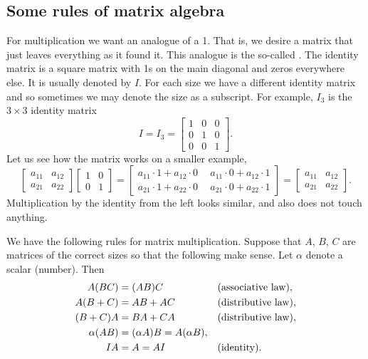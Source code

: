 \subsection{Some rules of matrix algebra}

For multiplication we want an analogue of a 1.  That is,
we desire a matrix that just leaves everything as it found it.
This analogue is the
so-called \emph{}.
The identity matrix is a square matrix with 1s on the
main diagonal and zeros everywhere else.  It is usually denoted by $I$.
For each size we have a different identity matrix and so sometimes we may denote
the size as a subscript.  For example, $I_3$ is the $3 \times 3$
identity matrix
\begin{equation*}
I = I_3 =
\begin{bmatrix}
1 & 0 & 0 \\
0 & 1 & 0 \\
0 & 0 & 1
\end{bmatrix} .
\end{equation*}
Let us see how the matrix works on a smaller example,
\begin{equation*}
\begin{bmatrix}
a_{11} & a_{12} \\
a_{21} & a_{22}
\end{bmatrix}
\begin{bmatrix}
1 & 0 \\
0 & 1
\end{bmatrix} =
\begin{bmatrix}
a_{11} \cdot 1 + a_{12} \cdot 0
& ~~
a_{11} \cdot 0 + a_{12} \cdot 1
\\
a_{21} \cdot 1 + a_{22} \cdot 0
& ~~
a_{21} \cdot 0 + a_{22} \cdot 1
\end{bmatrix}
=
\begin{bmatrix}
a_{11} & a_{12} \\
a_{21} & a_{22}
\end{bmatrix} .
\end{equation*}
Multiplication by the identity from the left looks similar, and also
does not touch anything.

\medskip

We have the following rules for matrix multiplication.  Suppose that
$A$, $B$, $C$ are matrices of the correct sizes so that the following
make sense.  Let $\alpha$ denote a scalar (number).  Then
\begin{align*}
A(BC) & = (AB)C & & \text{(\myindex{associative law})} , \\
A(B+C) & = AB + AC & & \text{(\myindex{distributive law})} , \\
(B+C)A & = BA + CA & & \text{(distributive law)} , \\
\alpha(AB) & = (\alpha A)B = A(\alpha B) , & &  \\
IA & = A = AI & & \text{(identity)}.
\end{align*}

